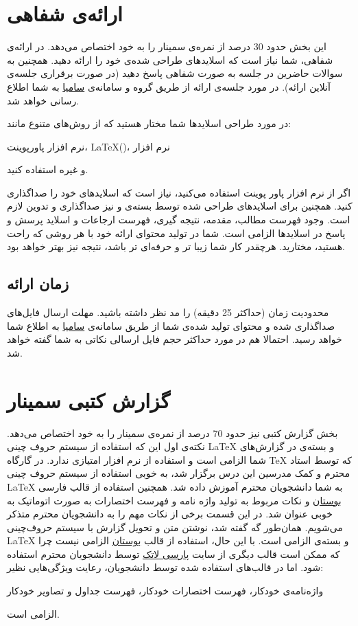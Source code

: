\section {ارائه‌ی شفاهی}\label{L2}
این بخش حدود 30 درصد از نمره‌ی سمینار را به خود اختصاص می‌دهد. در ارائه‌ی شفاهی، شما نیاز است که اسلاید‌های طراحی شده‌ی خود را ارائه دهید. همچنین به سوالات حاضرین در جلسه به صورت شفاهی پاسخ دهید (در صورت برقراری جلسه‌ی آنلاین ارائه). در مورد جلسه‌ی ارائه از طریق گروه و سامانه‌ی 
\href {http://lms.iust.ac.ir/}{سامیا}
به شما اطلاع رسانی خواهد شد. 
\begin{ntpoint}
	در مورد طراحی اسلاید‌ها شما مختار هستید که از روش‌های متنوع مانند:
	\begin{itemize}
		\sci
		نرم افزار پاورپوینت،
		\sci 
		\LaTeX ()،
		\sci 
		نرم افزار
	\end{itemize}
	و غیره استفاده کنید. 
\end{ntpoint}
اگر از نرم افزار  پاور پوینت استفاده می‌کنید، نیاز است که اسلاید‌های خود را صداگذاری کنید. همچنین برای اسلاید‌های طراحی شده توسط بسته‌ی 
و 
نیز صداگذاری و تدوین لازم است. 
وجود فهرست مطالب، مقدمه، نتیجه گیری، فهرست ارجاعات و اسلاید پرسش و پاسخ در اسلاید‌ها الزامی است. شما در تولید محتوای ارائه خود با هر روشی که راحت هستید، مختارید. هرچقدر کار شما زیبا تر و حرفه‌ای تر باشد، نتیجه نیز بهتر خواهد بود.
\subsection{زمان ارائه}
محدودیت زمان (حداکثر 25 دقیقه) را مد نظر داشته باشید. مهلت ارسال فایل‌های صداگذاری شده و محتوای‌ تولید شده‌ی شما از طریق سامانه‌ی 
	\href{http://lms.iust.ac.ir/}{سامیا}
به اطلاع شما خواهد رسید. احتمالا هم در مورد حداکثر حجم فایل ارسالی نکاتی به شما گفته خواهد شد.
\section{گزارش‌  کتبی سمینار}\label{L3}
بخش گزارش کتبی نیز حدود 70 درصد از نمره‌ی سمینار را به خود اختصاص می‌دهد. نکته‌ی اول این که استفاده از سیستم حروف چینی 
\LaTeX
و بسته‌ی 
\XePersian
در گزارش‌های شما الزامی است و استفاده از نرم افزار
امتیازی ندارد. در گارگاه 
\TeX
که توسط  استاد محترم و کمک مدرسین این درس برگزار شد، به خوبی استفاده از سیستم حروف چینی 
\LaTeX
به شما دانشجویان محترم آموزش داده شد. همچنین  استفاده از قالب  فارسی 
\href{https://github.com/abodin/Boostan}{بوستان}
و نکات مربوط به تولید واژه نامه و فهرست اختصارات به صورت اتوماتیک به خوبی عنوان شد.
در این قسمت برخی از نکات مهم را به دانشجویان محترم متذکر می‌شویم. همان‌طور گه گفته شد، نوشتن متن و تحویل گزارش با سیستم حروف‌چینی 
\LaTeX
و بسته‌ی 
\XePersian
الزامی است. با این حال، استفاده از قالب
\href{https://github.com/abodin/Boostan}{بوستان}
الزامی نیست چرا که ممکن است قالب دیگری از سایت
\href{http://www.parsilatex.com/wiki/}{پارسی لاتک}
توسط دانشجویان محترم استفاده شود. 
اما در قالب‌های 
\XePersian
استفاده شده توسط دانشجویان،
رعایت ویژگی‌هایی نظیر:
\begin{itemize}
	\tick
	واژه‌نامه‌ی خودکار،
	\tick
	فهرست اختصارات خودکار،
	\tick 
	فهرست جداول و تصاویر خودکار
\end{itemize}
الزامی است. 

